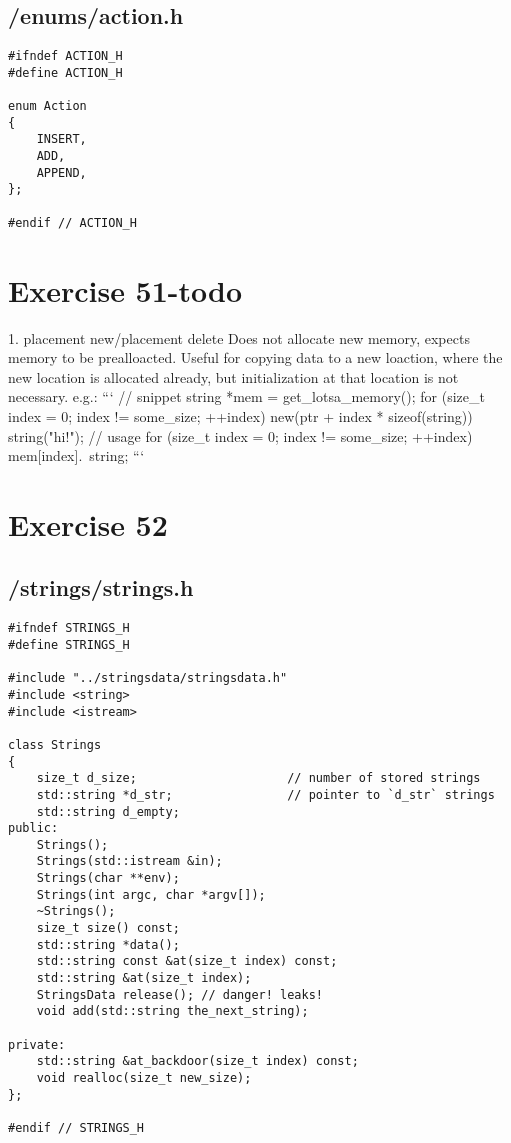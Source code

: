 \documentclass{article}
\begin{document}
\subsection*{/enums/action.h}
\begin{verbatim}
#ifndef ACTION_H
#define ACTION_H

enum Action
{
    INSERT,
    ADD,
    APPEND,
};

#endif // ACTION_H
\end{verbatim}


\section*{Exercise 51-todo}
1. placement new/placement delete
Does not allocate new memory, expects memory to be prealloacted. Useful for 
copying data to a new loaction, where the new location is allocated already,
but initialization at that location is not necessary. e.g.:
```
// snippet
string *mem = get_lotsa_memory();
for (size_t index = 0; index != some_size; ++index)
    new(ptr + index * sizeof(string)) string("hi!");
// usage
for (size_t index = 0; index != some_size; ++index)
    mem[index].~string;
```



\section*{Exercise 52}
\subsection*{/strings/strings.h}
\begin{verbatim}
#ifndef STRINGS_H
#define STRINGS_H

#include "../stringsdata/stringsdata.h"
#include <string>
#include <istream>

class Strings 
{
    size_t d_size;                     // number of stored strings
    std::string *d_str;                // pointer to `d_str` strings
    std::string d_empty;
public:
    Strings();
    Strings(std::istream &in);
    Strings(char **env);
    Strings(int argc, char *argv[]);
    ~Strings();
    size_t size() const;
    std::string *data();
    std::string const &at(size_t index) const;
    std::string &at(size_t index);
    StringsData release(); // danger! leaks!
    void add(std::string the_next_string);

private:
    std::string &at_backdoor(size_t index) const;
    void realloc(size_t new_size);
};

#endif // STRINGS_H

\end{verbatim}
\end{document}
